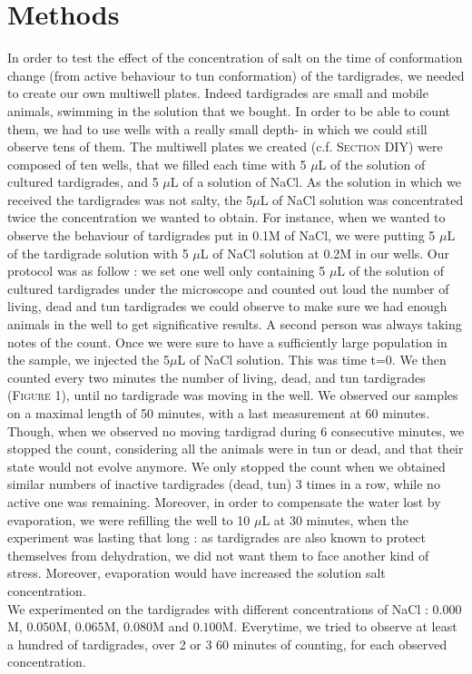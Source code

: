 \documentclass[12pt,a4paper, twocolumn]{article}
\begin{document}
\section{Methods}
In order to test the effect of the concentration of salt on the time of conformation change (from active behaviour to tun conformation) of  the tardigrades, we needed to create our own multiwell plates. Indeed tardigrades are small and mobile animals, swimming in the solution that we bought. In order to be able to count them, we had to use wells with a really small depth- in which we could still observe tens of them. The multiwell plates we created (c.f. \textsc{Section} DIY) were composed of ten wells, that we filled each time with 5 $\mu$L of the solution of cultured tardigrades, and 5 $\mu$L of a solution of NaCl. As the solution in which we received the tardigrades was not salty, the 5$\mu$L of NaCl solution was concentrated twice the concentration we wanted to obtain. For instance, when we wanted to observe the behaviour of tardigrades put in 0.1M of NaCl, we were putting  5 $\mu$L of the tardigrade solution with 5 $\mu$L of NaCl solution at 0.2M in our wells.
Our protocol was as follow : we set one well only containing 5 $\mu$L of the solution of cultured tardigrades under the microscope and counted out loud the number of living, dead and tun tardigrades we could observe to make sure we had enough animals in the well to get significative results. A second person was always taking notes of the count. Once we were sure to have a sufficiently large population in the sample, we injected the 5$\mu$L of NaCl solution. This was time t=0. We then counted every two minutes the number of living, dead, and tun tardigrades (\textsc{Figure} 1), until no tardigrade was moving in the well. We observed our samples on a maximal length of 50 minutes, with a last measurement at 60 minutes. Though, when we observed no moving tardigrad during 6 consecutive minutes, we stopped the count, considering all the animals were in tun or dead, and that their state would not evolve anymore. We only stopped the count when we obtained similar numbers of inactive tardigrades (dead, tun) 3 times in a row, while no active one was remaining.
Moreover, in order to compensate the water lost by evaporation, we were refilling the well to 10 $\mu$L at 30 minutes, when the experiment was lasting that long : as tardigrades are also known to protect themselves from dehydration, we did not want them to face another kind of stress. Moreover, evaporation would have increased the solution salt concentration.\\
We experimented on the tardigrades with different concentrations of NaCl : $0.000$M, $0.050$M, $0.065$M, $0.080$M and $0.100$M. Everytime, we tried to observe at least a hundred of tardigrades, over 2 or 3 60 minutes of counting, for each observed concentration. \\
\end{document}
